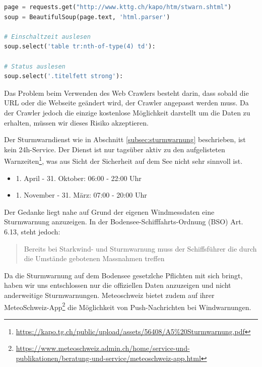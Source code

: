 \begin{lstlisting}[label=lst:kttgCrawler,caption=Web Crawler für die Sturmwarndaten, language=Python]
page = requests.get("http://www.kttg.ch/kapo/htm/stwarn.shtml")
soup = BeautifulSoup(page.text, 'html.parser')

# Einschaltzeit auslesen
soup.select('table tr:nth-of-type(4) td'):

# Status auslesen
soup.select('.titelfett strong'):
\end{lstlisting}

Das Problem beim Verwenden des Web Crawlers besteht darin, dass sobald die URL oder die Webseite geändert wird, der Crawler angepasst werden muss. Da der Crawler jedoch die einzige kostenlose Möglichkeit darstellt um die Daten zu erhalten, müssen wir dieses Risiko akzeptieren.

Der Sturmwarndienst wie in Abschnitt \ref{subsec:sturmwarnung} beschrieben, ist kein 24h-Service. Der Dienst ist nur tagsüber aktiv zu den aufgelisteten Warnzeiten\footnote{ \url{https://kapo.tg.ch/public/upload/assets/56408/A5\%20Sturmwarnung.pdf}}, was aus Sicht der Sicherheit auf dem See nicht sehr sinnvoll ist.

\begin{itemize}
\item 1. April - 31. Oktober: 06:00 - 22:00 Uhr
\item 1. November - 31. März: 07:00 - 20:00 Uhr
\end{itemize}

\noindent
Der Gedanke liegt nahe auf Grund der eigenen Windmessdaten eine Sturmwarnung anzuzeigen. In der Bodensee-Schifffahrts-Ordnung (BSO) Art. 6.13, steht jedoch:

\begin{quote}
\flqq Bereits bei Starkwind- und Sturmwarnung muss der Schiffsführer die durch die Umstände gebotenen Massnahmen treffen \frqq
\end{quote}

\noindent
 Da die Sturmwarnung auf dem Bodensee gesetzlche Pflichten mit sich bringt, haben wir uns entschlossen nur die offiziellen Daten anzuzeigen und nicht anderweitige Sturmwarnungen. Meteoschweiz bietet zudem auf ihrer MeteoSchweiz-App\footnote{ \url{https://www.meteoschweiz.admin.ch/home/service-und-publikationen/beratung-und-service/meteoschweiz-app.html}} die Möglichkeit von Push-Nachrichten bei Windwarnungen.




